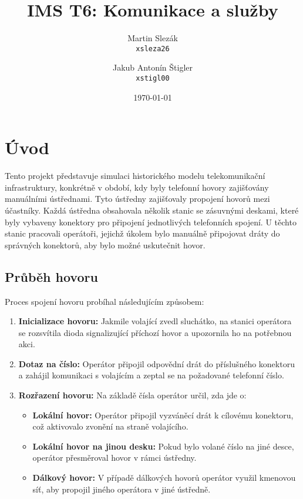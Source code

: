 \documentclass{article}
\title{IMS T6: Komunikace a služby}
\author{
    Martin Slezák\\
    \texttt{xsleza26}
    \and
    Jakub Antonín Štigler\\
    \texttt{xstigl00}
}
\date{\today}
\begin{document}
\maketitle

\newpage
\tableofcontents

\newpage
\section{Úvod}

Tento projekt představuje simulaci historického modelu telekomunikační
infrastruktury\cite{wikipedia}, konkrétně v období, kdy byly telefonní hovory
zajišťovány manuálními ústřednami. Tyto ústředny zajišťovaly propojení hovorů
mezi účastníky. Každá ústředna obsahovala několik stanic se zásuvnými deskami,
které byly vybaveny konektory pro připojení jednotlivých telefonních spojení.
U těchto stanic pracovali operátoři, jejichž úkolem bylo manuálně připojovat
dráty do správných konektorů, aby bylo možné uskutečnit hovor.

\subsection{Průběh hovoru}

Proces spojení hovoru probíhal následujícím způsobem:

\begin{enumerate}
    \item \textbf{Inicializace hovoru:} Jakmile volající zvedl sluchátko, na
        stanici operátora se rozsvítila dioda signalizující příchozí hovor a
        upozornila ho na potřebnou akci.
    \item \textbf{Dotaz na číslo:} Operátor připojil odpovědní drát do
        příslušného konektoru a zahájil komunikaci s volajícím a zeptal se na
        požadované telefonní číslo.
    \item \textbf{Rozřazení hovoru:} Na základě čísla operátor určil, zda jde
        o:
        \begin{itemize}
            \item \textbf{Lokální hovor:} Operátor připojil vyzváněcí drát k
                cílovému konektoru, což aktivovalo zvonění na straně
                volajícího.
            \item \textbf{Lokální hovor na jinou desku:} Pokud bylo volané
                číslo na jiné desce, operátor přesměroval hovor v rámci
                ústředny.
            \item \textbf{Dálkový hovor:} V případě dálkových hovorů
                operátor využil kmenovou síť, aby propojil jiného operátora v
                jiné ústředně.
        \end{itemize}
\end{enumerate}
\end{document}
